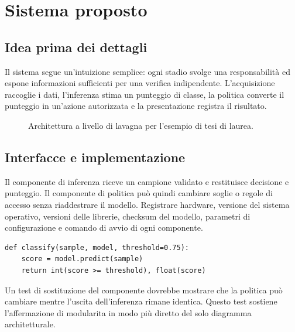 \chapter{Sistema proposto}\label{ch:b-design}
\section{Idea prima dei dettagli}
Il sistema segue un'intuizione semplice: ogni stadio svolge una responsabilità ed espone informazioni sufficienti per una verifica indipendente. L'acquisizione raccoglie i dati, l'inferenza stima un punteggio di classe, la politica converte il punteggio in un'azione autorizzata e la presentazione registra il risultato.

\begin{figure}[htbp]
\centering
{}\pipelinearrow
{}\pipelinearrow
{}\pipelinearrow
{}
\caption{Architettura a livello di lavagna per l'esempio di tesi di laurea.}
\label{fig:b-architecture}
\end{figure}

\section{Interfacce e implementazione}
Il componente di inferenza riceve un campione validato e restituisce decisione e punteggio. Il componente di politica può quindi cambiare soglie o regole di accesso senza riaddestrare il modello. Registrare hardware, versione del sistema operativo, versioni delle librerie, checksum del modello, parametri di configurazione e comando di avvio di ogni componente.

\begin{verbatim}
def classify(sample, model, threshold=0.75):
    score = model.predict(sample)
    return int(score >= threshold), float(score)
\end{verbatim}

\begin{resultbox}
Un test di sostituzione del componente dovrebbe mostrare che la politica può cambiare mentre l'uscita dell'inferenza rimane identica. Questo test sostiene l'affermazione di modularita in modo più diretto del solo diagramma architetturale.
\end{resultbox}

